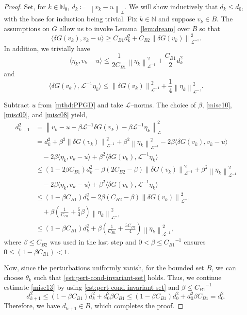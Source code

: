 \documentclass{amsart}
\newcommand{\polN}{\mathbb N}
\newcommand{\vk}{{v_{k}}}
\newcommand{\etak}{{\eta_{k}}}
\newcommand{\dG}{{\delta G}}
\newcommand{\LL}{\mathcal{L}}
\newcommand{\LLinv}{{\mathcal{L}^{-1}}}
\newcommand{\norm}[2]{\left\| #1 \right\| _{#2}}
\newcommand{\pairing}[2]{\bigl\langle #1 , #2 \bigr\rangle}
\newcommand{\s}{{\beta}}	%
\newcommand{\CdvB}{{C_{B1}}} %
\newcommand{\CddB}{{C_{B2}}} %
\theoremstyle{definition}
\begin{document}
	\begin{proof}
  Set, for $k \in \polN_0$, $d_k \coloneqq \norm{v_k - u}{\LL}$. We will show inductively that $d_k \leq d_0$, with the base for induction being trivial. Fix $k \in \polN$ and suppose $\vk\in B$. The assumptions on $G$ allow us to invoke Lemma~\ref{lem:dream} over $B$ so that
	\begin{equation}\label{misc10}
		\pairing{\dG(\vk)}{\vk-u} \ge \CdvB d_{k}^2 + \CddB \norm{\dG(\vk)}{\LLinv}^2.
	\end{equation}
	In addition, we trivially have
	\begin{equation}\label{misc09}
		\pairing{\etak}{\vk -u}
		\le	\frac{1}{2\CdvB} \norm{\etak}{\LLinv}^2+  \frac{\CdvB}{2}d_{k}^2
	\end{equation}
	and
	\begin{equation}\label{misc08}
		\pairing{\dG(\vk)}{\LLinv\etak}
		\le 
		\norm{\dG(\vk)}{\LLinv}^2+ \frac{1}{4} \norm{\etak}{\LLinv}^2.
	\end{equation}
	
	Subtract $u$ from \eqref{mthd:PPGD} and take $\LL$--norms. The choice of $\s$, \eqref{misc10}, \eqref{misc09}, and \eqref{misc08} yield,
	\begin{equation}
	\label{misc13}
	  \begin{aligned}
      d_{k+1}^2 &=\norm{\vk-u -\s\LLinv \delta G(\vk)-\s\LLinv\etak}{\LL}^2
      \\
      &= d_{k}^2 + \s^2\norm{\delta G(\vk)}{\LLinv}^2 + \s^2\norm{\etak}{\LLinv}^2 -2\s\pairing{\dG(\vk)}{\vk-u}
	\\
& \quad - 2\s\pairing{\etak}{\vk-u} +\s^2\pairing{\dG(\vk)}{\LLinv\etak}
      \\
      &\le (1-2\s \CdvB) d_{k}^2 - \s(2\CddB -\s)\norm{\delta G(\vk)}{\LLinv}^2 + \s^2\norm{\etak}{\LLinv}^2
	\\
& \quad - 2\s\pairing{\etak}{\vk-u} +\s^2\pairing{\dG(\vk)}{\LLinv\etak}
      \\
      &\le \left(1-\s\CdvB \right)d_{k}^2 - 2\s\left(\CddB -\s\right)\norm{\delta G(\vk)}{\LLinv}^2
	\\
& \quad +\s\left(\frac{1}{\CdvB} +\frac 5 4 \s\right)\norm{\etak}{\LLinv}^2
      \\
      &\le \left(1-\s\CdvB \right)d_{k}^2  + \s \left(\frac{1}{\CdvB} +\frac{5\CddB}{4} \right)\norm{\etak}{\LLinv}^2,
	  \end{aligned}
	\end{equation}
	where $\s \le \CddB$ was used in the last step and $0<\s \le \CdvB^{-1}$ ensures $0 \le \left(1-\s\CdvB \right) <1$.

	Now, since the perturbations uniformly vanish, for the bounded set $B$, we can choose $\theta_k$ such that \eqref{est:pert-cond-invariant-set} holds.
	Thus, we continue estimate \eqref{misc13} by using \eqref{est:pert-cond-invariant-set} and $\s \le \CdvB^{-1}$
	\[
		d_{k+1}^2 
		\le \left(1 - \s\CdvB \right) d_k^2 
		+
		d_0^2 \s\CdvB
		\le \left(1-\s\CdvB \right)d_0^2 +d_0^2 \s\CdvB
		= d_0^2.
	\]
	Therefore, we have $d_{k+1} \in B$, which completes the proof.
\end{proof}
\end{document}
